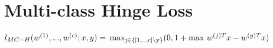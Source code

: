 \section*{Multi-class Hinge Loss}
$l_{MC-H}(w^{(1)},...,w^{(c)};x,y) =\\
\operatorname{max_{j \in \{[1,..,c]\setminus y\}}}(0,1+\text{max } w^{(j)T} x - w^{(y)T} x)$